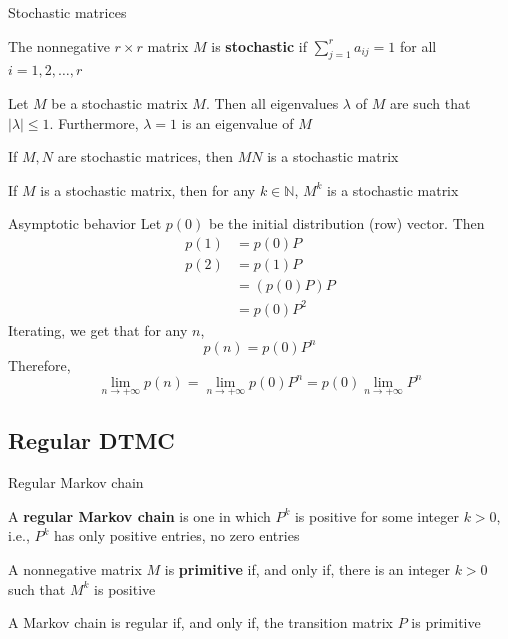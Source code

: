 \documentclass[aspectratio=43]{beamer}
\begin{document}
\begin{frame}{Stochastic matrices}
\begin{definition}
    The nonnegative $r\times r$ matrix $M$ is \textbf{stochastic} if $\sum_{j=1}^ra_{ij}=1$ for all $i=1,2,\dots, r$    
\end{definition}
\vfill
\begin{definition}
Let $M$ be a stochastic matrix $M$. Then all eigenvalues $\lambda$ of $M$ are such that $|\lambda|\leq 1$. Furthermore, $\lambda =1$ is an eigenvalue of $M$
\end{definition}
\vfill
\begin{theorem}
    If $M,N$ are stochastic matrices, then $MN$ is a stochastic matrix
\end{theorem}
\vfill
\begin{theorem}
    If $M$ is a stochastic matrix, then for any $k\in\mathbb{N}$, $M^k$ is a stochastic matrix
\end{theorem}
\end{frame}

\begin{frame}{Asymptotic behavior}
    Let $p(0)$ be the initial distribution (row) vector. Then
\begin{align*}
p(1) &= p(0)P \\
p(2) &= p(1)P\\
&= (p(0)P)P \\
&= p(0)P^2
\end{align*}
Iterating, we get that for any $n$,
$$
p(n)=p(0)P^n
$$
Therefore, 
$$
\lim_{n\rightarrow +\infty}p(n)=\lim_{n\rightarrow +\infty}p(0)P^n=p(0)\lim_{n\rightarrow +\infty}P^n
$$
\end{frame}

\subsection{Regular DTMC}

\begin{frame}{Regular Markov chain}
    \begin{definition}
        A \textbf{regular Markov chain} is one in which $P^k$ is positive for some integer $k>0$, i.e., $P^k$ has only positive entries, no zero entries
    \end{definition}    
    \vfill
    \begin{definition}
        A nonnegative matrix $M$ is \textbf{primitive} if, and only if, there is an integer $k>0$ such that $M^k$ is positive
    \end{definition}
    \begin{theorem}
        A Markov chain is regular if, and only if, the transition matrix $P$ is primitive
    \end{theorem}
\end{frame}
\end{document}
